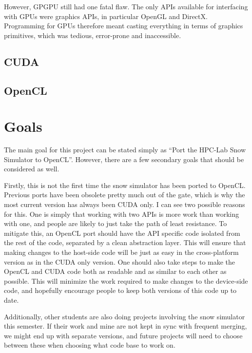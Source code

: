 However, GPGPU still had one fatal flaw. The only APIs available for interfacing with GPUs were graphics APIs, in particular OpenGL and DirectX. Programming for GPUs therefore meant casting everything in terms of graphics primitives, which was tedious, error-prone and inaccessible.

\subsection{CUDA}

\subsection{OpenCL}


\section{Goals}
The main goal for this project can be stated simply as “Port the HPC-Lab Snow Simulator to OpenCL”. However, there are a few secondary goals that should be considered as well.

Firstly, this is not the first time the snow simulator has been ported to OpenCL. Previous ports have been obsolete pretty much out of the gate, which is why the most current version has always been CUDA only. I can see two possible reasons for this. One is simply that working with two APIs is more work than working with one, and people are likely to just take the path of least resistance. To mitigate this, an OpenCL port should have the API specific code isolated from the rest of the code, separated by a clean abstraction layer. This will ensure that making changes to the host-side code will be just as easy in the cross-platform version as in the CUDA only version. One should also take steps to make the OpenCL and CUDA code both as readable and as similar to each other as possible. This will minimize the work required to make changes to the device-side code, and hopefully encourage people to keep both versions of this code up to date.

Additionally, other students are also doing projects involving the snow simulator this semester. If their work and mine are not kept in sync with frequent merging, we might end up with separate versions, and future projects will need to choose between these when choosing what code base to work on.

